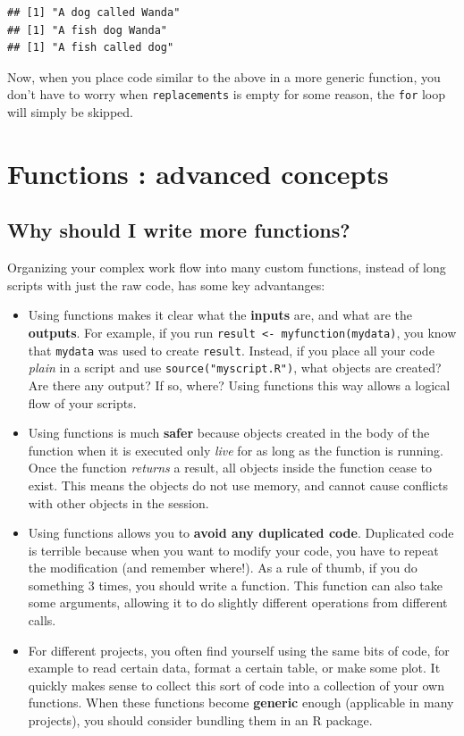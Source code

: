 \documentclass[]{book}
\begin{document}
\begin{verbatim}
## [1] "A dog called Wanda"
## [1] "A fish dog Wanda"
## [1] "A fish called dog"
\end{verbatim}

Now, when you place code similar to the above in a more generic function, you don't have to worry when \texttt{replacements} is empty for some reason, the \texttt{for} loop will simply be skipped.

\hypertarget{functionsadvanced}{%
\section{Functions : advanced concepts}\label{functionsadvanced}}

\hypertarget{why-should-i-write-more-functions}{%
\subsection{Why should I write more functions?}\label{why-should-i-write-more-functions}}

Organizing your complex work flow into many custom functions, instead of long scripts with just the raw code, has some key advantanges:

\begin{itemize}
\item
  Using functions makes it clear what the \textbf{inputs} are, and what are the \textbf{outputs}. For example, if you run \texttt{result\ \textless{}-\ myfunction(mydata)}, you know that \texttt{mydata} was used to create \texttt{result}. Instead, if you place all your code \emph{plain} in a script and use \texttt{source("myscript.R")}, what objects are created? Are there any output? If so, where? Using functions this way allows a logical flow of your scripts.
\item
  Using functions is much \textbf{safer} because objects created in the body of the function when it is executed only \emph{live} for as long as the function is running. Once the function \emph{returns} a result, all objects inside the function cease to exist. This means the objects do not use memory, and cannot cause conflicts with other objects in the session.
\item
  Using functions allows you to \textbf{avoid any duplicated code}. Duplicated code is terrible because when you want to modify your code, you have to repeat the modification (and remember where!). As a rule of thumb, if you do something 3 times, you should write a function. This function can also take some arguments, allowing it to do slightly different operations from different calls.
\item
  For different projects, you often find yourself using the same bits of code, for example to read certain data, format a certain table, or make some plot. It quickly makes sense to collect this sort of code into a collection of your own functions. When these functions become \textbf{generic} enough (applicable in many projects), you should consider bundling them in an R package.
\end{itemize}
\end{document}
